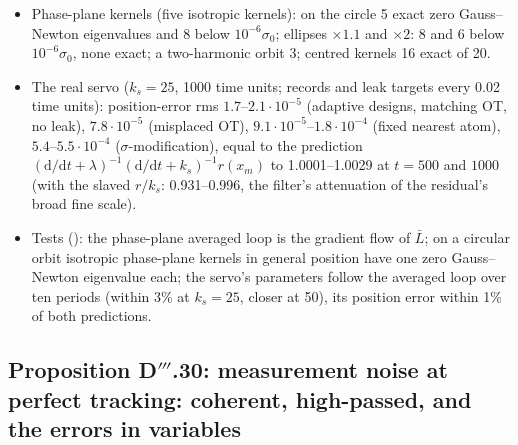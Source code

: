 \begin{itemize}
    $s=2000$; no leak 0.0152, 0.0147, 0.0147. The collapsed $K_0$-atom flow from the engineer's model at $\eta=\infty$:
    0.0297, 0.0213, 0.0169, 0.0155 at $s=600$, $2000$, $10^4$, $10^5$.
  \item Phase-plane kernels (five isotropic kernels): on the circle 5 exact zero Gauss--Newton eigenvalues and 8 below
    $10^{-6}\sigma_0$; ellipses $\times1.1$ and $\times2$: 8 and 6 below $10^{-6}\sigma_0$, none exact; a two-harmonic
    orbit 3; centred kernels 16 exact of 20.
  \item The real servo ($k_s=25$, 1000 time units; records and leak targets every 0.02 time units): position-error
    rms $1.7$--$2.1\cdot10^{-5}$ (adaptive designs, matching OT, no leak), $7.8\cdot10^{-5}$ (misplaced OT),
    $9.1\cdot10^{-5}$--$1.8\cdot10^{-4}$ (fixed nearest atom), $5.4$--$5.5\cdot10^{-4}$ ($\sigma$-modification), equal
    to the prediction $(\mathrm{d}/\mathrm{d}t+\lambda)^{-1}(\mathrm{d}/\mathrm{d}t+k_s)^{-1}r(x_m)$ to
    1.0001--1.0029 at $t=500$ and $1000$ (with the slaved $r/k_s$: 0.931--0.996, the filter's attenuation of the
    residual's broad fine scale).
  \item Tests (): the phase-plane averaged loop is the gradient flow of $\bar L$; on a
    circular orbit isotropic phase-plane kernels in general position have one zero Gauss--Newton eigenvalue each; the
    servo's parameters follow the averaged loop over ten periods (within 3\% at $k_s=25$, closer at 50), its position
    error within 1\% of both predictions.
\end{itemize}

\subsection{Proposition D\texorpdfstring{$'''$}{'''}.30: measurement noise at perfect tracking: coherent, high-passed,
and the errors in variables}

